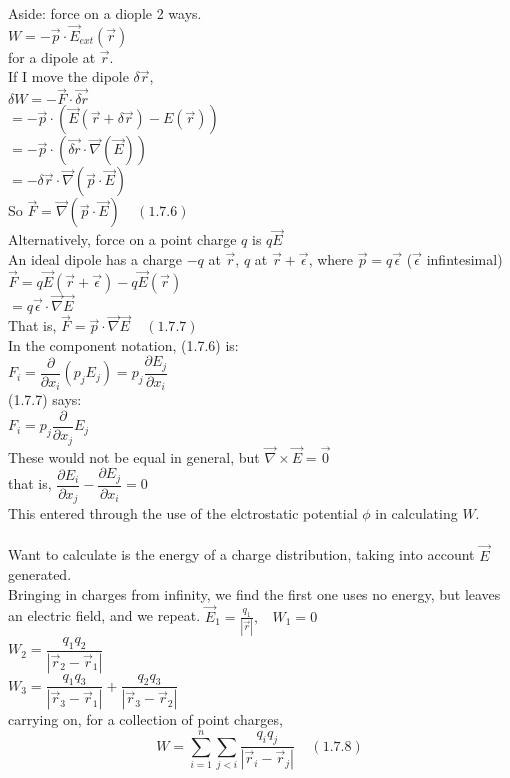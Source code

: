 \documentclass[a4paper,11pt]{article}
\newcommand{\pd}[2]{\dfrac{\partial #1}{\partial #2}}
\newcommand{\Nab}{\vec{\nabla}}
\newcommand{\dop}[2]{\vec{#1}\cdot\vec{#2}}
\begin{document}
Aside: force on a diople 2 ways.\\
$W=-\vec{p}\cdot\vec{E}_{ext}(\vec{r})$\\
for a dipole at $\vec{r}$.\\
If I move the dipole $\delta\vec{r}$,\\
$\delta W=-\dop{F}{\delta r}$\\
$=-\vec{p}\cdot(\vec{E}(\vec{r}+\delta\vec{r})-E(\vec{r}))$\\
$=-\vec{p}\cdot(\dop{\delta r}{\nabla}(\vec{E}))$\\
$=-\delta\dop{r}{\nabla}(\dop{p}{E})$\\
So $\vec{F}=\Nab(\dop{p}{E})~~~~~(1.7.6)$\\
Alternatively, force on a point charge $q$ is $q\vec{E}$\\
An ideal dipole has a charge $-q$ at $\vec{r}$, $q$ at $\vec{r}+\vec{\epsilon}$, where $\vec{p}=q\vec{\epsilon}$ ($\vec{\epsilon}$ infintesimal)\\
$\vec{F}=q\vec{E}(\vec{r}+\vec{\epsilon})-q\vec{E}(\vec{r})$\\
$=q\dop{\epsilon}{\nabla}\vec{E}$\\
That is, $\vec{F}=\dop{p}{\nabla}\vec{E}~~~~~(1.7.7)$\\
In the component notation, (1.7.6) is:\\
$F_i=\pd{}{x_i}(p_j E_j)=p_j\pd{E_j}{x_i}$\\
(1.7.7) says:\\
$F_i=p_j\pd{}{x_j}E_j$\\
These would not be equal in general, but $\Nab \times \vec{E}=\vec{0}$\\
that is, $\pd{E_i}{x_j}-\pd{E_j}{x_i}=0$\\
This entered through the use of the elctrostatic potential $\phi$ in calculating $W$.\\
\\
Want to calculate is the energy of a charge distribution, taking into account $\vec{E}$ generated.\\
Bringing in charges from infinity, we find the first one uses no energy, but leaves an electric field, and we repeat.
$\vec{E}_1=\frac{q_1}{|\vec{r}|},~~~~W_1=0$\\
$W_2=\dfrac{q_1q_2}{|\vec{r}_2-\vec{r}_1|}$\\
$W_3=\dfrac{q_1q_3}{|\vec{r}_3-\vec{r}_1|}+\dfrac{q_2q_3}{|\vec{r}_3-\vec{r}_2|}$\\
carrying on, for a collection of point charges,
$$W=\sum^n _{i=1}\sum_{j<i}\dfrac{q_iq_j}{|\vec{r}_i-\vec{r}_j|}~~~~~(1.7.8)$$
\end{document}
